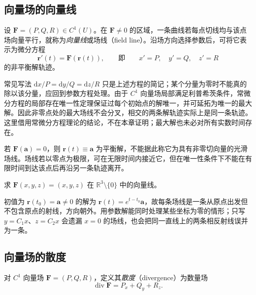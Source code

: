 \documentclass[UTF8,12pt,a4paper,fontset=fandol]{ctexbook}
\begin{document}
\subsection{向量场的向量线}
\label{subsec:field-lines-of-vector-fields}

\begin{definition}
\label{def:vector-field-lines}
设 $\boldsymbol F=(P,Q,R)\in C^1(U)$。在 $\boldsymbol F\neq0$ 的区域，一条曲线若每点切线均与该点场向量平行，就称为\emph{向量线}或场线（field line）。沿场方向选择参数后，可将它表示为微分方程
\begin{equation}
\label{eq:field-line-ode}
    \boldsymbol r'(t)=\boldsymbol F(\boldsymbol r(t)),
    \qquad\text{即}\qquad x'=P,\quad y'=Q,\quad z'=R
\end{equation}
的非平衡解轨迹。
\end{definition}

常见写法 $\mathrm dx/P=\mathrm dy/Q=\mathrm dz/R$ 只是上述方程的简记；某个分量为零时不能真的除以该分量，应回到参数方程处理。由于 $C^1$ 向量场局部满足利普希茨条件，常微分方程的局部存在唯一性定理保证过每个初始点的解唯一，并可延拓为唯一的最大解。因此非零点处的最大场线不会分叉，相交的两条解轨迹实际上是同一条轨迹。这里借用常微分方程理论的结论，不在本章证明；最大解也未必对所有实数时间存在。

若 $\boldsymbol F(\boldsymbol a)=0$，则 $\boldsymbol r(t)\equiv\boldsymbol a$ 为平衡解，不能据此称它为具有非零切向量的光滑场线。场线若以零点为极限，可在无限时间内接近它，但在唯一性条件下不能在有限时间到达该点后再沿另一条轨迹离开。

\begin{example}
\label{ex:radial-vector-field-lines}
求 $\boldsymbol F(x,y,z)=(x,y,z)$ 在 $\mathbb R^3\setminus\{0\}$ 中的向量线。
\end{example}
\begin{solve}
初值为 $\boldsymbol r(t_0)=\boldsymbol a\neq0$ 的解为 $\boldsymbol r(t)=e^{t-t_0}\boldsymbol a$，故每条场线是一条从原点出发但不包含原点的射线，方向朝外。用参数解能同时处理某些坐标为零的情形；只写 $y=C_1x$、$z=C_2x$ 会遗漏 $x=0$ 的场线，也会把同一直线上的两条相反射线误并为一条。
\end{solve}

\subsection{向量场的散度}
\label{subsec:divergence-of-vector-fields}

\begin{definition}
\label{def:vector-field-divergence}
对 $C^1$ 向量场 $\boldsymbol F=(P,Q,R)$，定义其\emph{散度}（divergence）为数量场
\[
    \operatorname{div}\boldsymbol F=P_x+Q_y+R_z.
\]
\end{definition}
\end{document}
